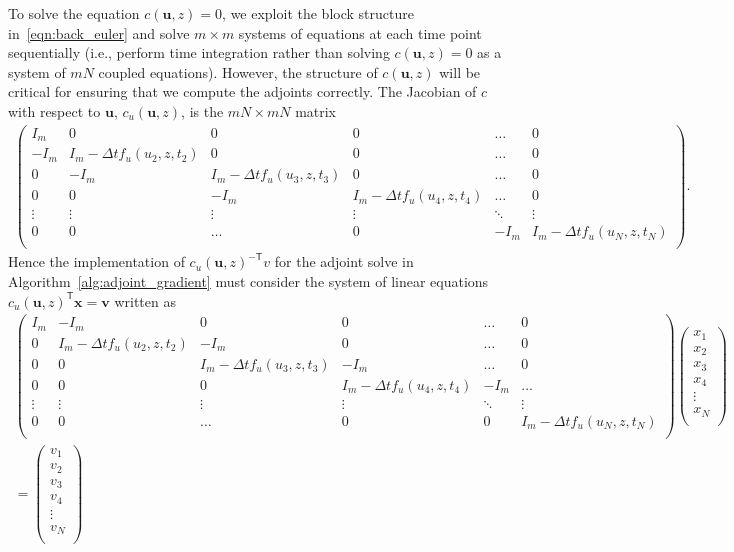 \documentclass{article}
\renewcommand{\vec}[1] {\ensuremath{\boldsymbol{#1}}}
\def\u{{\vec{u}}}
\def\x{{\vec{x}}}
\def\v{{\vec{v}}}
\newcommand{\trp}{^{\mathsf{T}}}
\newcommand{\invtrp}{^{-\mathsf{T}}}
\begin{document}
To solve the equation $c(\u,z)=0$, we exploit the block structure in~\eqref{eqn:back_euler} and solve $m \times m$ systems of equations at each time point sequentially (i.e., perform time integration rather than solving $c(\u,z)=0$ as a system of $mN$ coupled equations). However, the structure of $c(\u,z)$ will be critical for ensuring that we compute the adjoints correctly. The Jacobian of $c$ with respect to $\u$, $c_u(\u,z) $, is the $mN \times mN$ matrix
\begin{align*}
\left( \begin{array}{cccccc}
I_m & 0 & 0 & 0 & \dots & 0 \\
-I_m & I_m - \Delta t f_u(u_2,z,t_2) & 0 & 0 & \dots & 0 \\
0 & -I_m & I_m - \Delta t f_u(u_3,z,t_3) & 0 & \dots & 0 \\
0 & 0 & -I_m & I_m - \Delta t f_u(u_4,z,t_4) & \dots & 0 \\
\vdots & \vdots & \vdots & \vdots & \ddots & \vdots \\
0 & 0  & \dots & 0 & -I_m & I_m - \Delta t f_u(u_N,z,t_N) \\
\end{array} \right).
\end{align*}
Hence the implementation of $c_u(\u,z)\invtrp v$ for the adjoint solve in Algorithm~\ref{alg:adjoint_gradient} must consider the system of linear equations $c_u(\u,z)\trp \x = \v$ written as
\begin{align*}
\left( \begin{array}{cccccc}
I_m & -I_m & 0 & 0 & \dots & 0 \\
0 & I_m-\Delta t f_u(u_2,z,t_2) & -I_m & 0 & \dots & 0 \\
0 & 0 & I_m - \Delta t f_u(u_3,z,t_3) & -I_m & \dots & 0 \\
0 & 0 & 0 & I_m - \Delta t f_u(u_4,z,t_4) & -I_m & \dots  \\
\vdots & \vdots & \vdots & \vdots & \ddots & \vdots \\
0 & 0  & \dots & 0 & 0 & I_m - \Delta t f_u(u_N,z,t_N) \\
\end{array} \right)
\left( \begin{array}{c}
x_1 \\
x_2 \\
x_3 \\
x_4 \\
\vdots \\
x_N \\
\end{array} \right) \\
=
\left( \begin{array}{c}
v_1 \\
v_2 \\
v_3 \\
v_4 \\
\vdots \\
v_N \\
\end{array} \right)
\end{align*}
\end{document}
